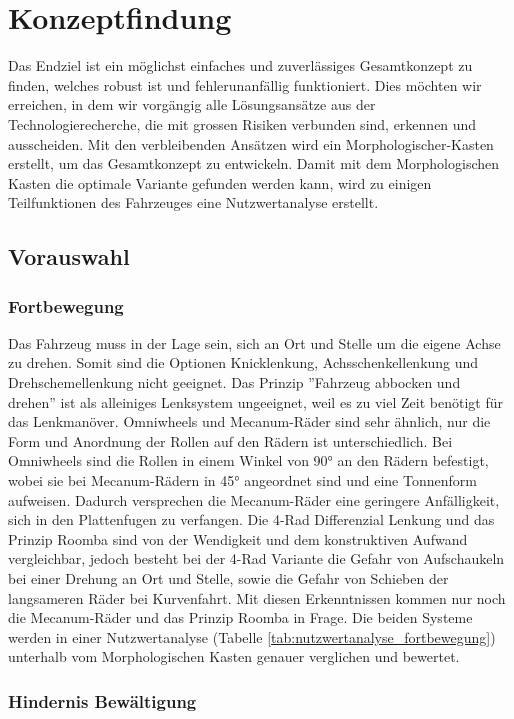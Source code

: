 \documentclass[../main.tex]{subfiles}
\begin{document}
\newpage
\section{Konzeptfindung}

Das Endziel ist ein möglichst einfaches und zuverlässiges Gesamtkonzept zu finden, welches robust ist und fehlerunanfällig funktioniert. Dies möchten wir erreichen, in dem wir vorgängig alle Lösungsansätze aus der Technologierecherche, die mit grossen Risiken verbunden sind, erkennen und ausscheiden. Mit den verbleibenden Ansätzen wird ein Morphologischer-Kasten erstellt, um das Gesamtkonzept zu entwickeln. Damit mit dem Morphologischen Kasten die optimale Variante gefunden werden kann, wird zu einigen Teilfunktionen des Fahrzeuges eine Nutzwertanalyse erstellt.

\subsection{Vorauswahl}
    \subsubsection{Fortbewegung}
    Das Fahrzeug muss in der Lage sein, sich an Ort und Stelle um die eigene Achse zu drehen. Somit sind die Optionen Knicklenkung, Achsschenkellenkung und Drehschemellenkung nicht geeignet.
    Das Prinzip ''Fahrzeug abbocken und drehen'' ist als alleiniges Lenksystem ungeeignet, weil es zu viel Zeit benötigt für das Lenkmanöver. 
    Omniwheels und Mecanum-Räder sind sehr ähnlich, nur die Form und Anordnung der Rollen auf den Rädern ist unterschiedlich. Bei Omniwheels sind die Rollen in einem Winkel von 90° an den Rädern befestigt, wobei sie bei Mecanum-Rädern in 45° angeordnet sind und eine Tonnenform aufweisen. Dadurch versprechen die Mecanum-Räder eine geringere Anfälligkeit, sich in den Plattenfugen zu verfangen. Die 4-Rad Differenzial Lenkung und das Prinzip Roomba sind von der Wendigkeit und dem konstruktiven Aufwand vergleichbar, jedoch besteht bei der 4-Rad Variante die Gefahr von Aufschaukeln bei einer Drehung an Ort und Stelle, sowie die Gefahr von Schieben der langsameren Räder bei Kurvenfahrt. Mit diesen Erkenntnissen kommen nur noch die Mecanum-Räder und das Prinzip Roomba in Frage. Die beiden Systeme werden in einer Nutzwertanalyse (Tabelle \ref{tab:nutzwertanalyse_fortbewegung}) unterhalb vom Morphologischen Kasten genauer verglichen und bewertet.
        
\newpage
\subsubsection{Hindernis Bewältigung}
\end{document}
